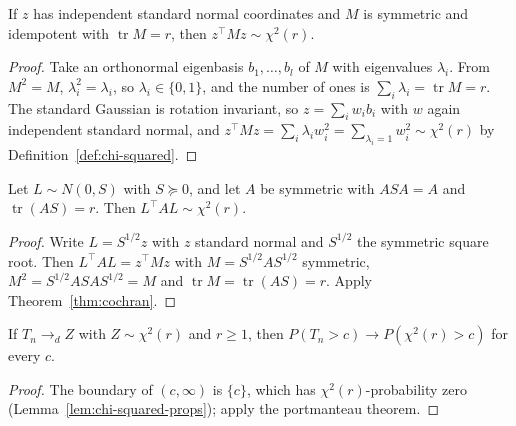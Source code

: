 \begin{theorem}
\label{thm:cochran}
\leanok
{}
If $z$ has independent standard normal coordinates and $M$ is symmetric and idempotent with $\operatorname{tr}M = r$,
then $z^\top Mz\sim\chi^2(r)$.
\end{theorem}
\begin{proof}
\leanok
Take an orthonormal eigenbasis $b_1,\dots,b_l$ of $M$ with eigenvalues $\lambda_i$. From $M^2 = M$,
$\lambda_i^2 = \lambda_i$, so $\lambda_i\in\{0,1\}$, and the number of ones is $\sum_i\lambda_i = \operatorname{tr}M =
r$. The standard Gaussian is rotation invariant, so $z = \sum_iw_ib_i$ with $w$ again independent standard normal, and
$z^\top Mz = \sum_i\lambda_iw_i^2 = \sum_{\lambda_i = 1}w_i^2\sim\chi^2(r)$ by Definition~\ref{def:chi-squared}.
\end{proof}

\begin{theorem}
\label{thm:quadform-gaussian}
\leanok
{}
Let $L\sim N(0,S)$ with $S\succeq0$, and let $A$ be symmetric with $ASA = A$ and $\operatorname{tr}(AS) = r$. Then
$L^\top AL\sim\chi^2(r)$.
\end{theorem}
\begin{proof}
\leanok
Write $L = S^{1/2}z$ with $z$ standard normal and $S^{1/2}$ the symmetric square root. Then $L^\top AL = z^\top Mz$ with
$M = S^{1/2}AS^{1/2}$ symmetric, $M^2 = S^{1/2}ASAS^{1/2} = M$ and $\operatorname{tr}M = \operatorname{tr}(AS) = r$.
Apply Theorem~\ref{thm:cochran}.
\end{proof}

\begin{lemma}
\label{lem:chi-squared-size}
\leanok
{}
If $T_n\to_d Z$ with $Z\sim\chi^2(r)$ and $r\ge1$, then $P(T_n > c)\to P(\chi^2(r) > c)$ for every $c$.
\end{lemma}
\begin{proof}
\leanok
The boundary of $(c,\infty)$ is $\{c\}$, which has $\chi^2(r)$-probability zero (Lemma~\ref{lem:chi-squared-props});
apply the portmanteau theorem.
\end{proof}

